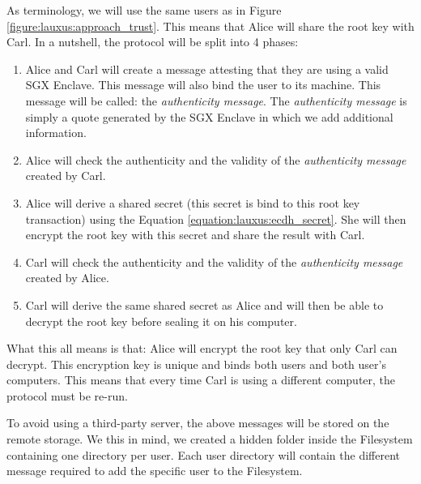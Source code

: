 \documentclass[../main.tex]{subfiles}
\begin{document}
\medbreak
\par As terminology, we will use the same users as in Figure \ref{figure:lauxus:approach_trust}. This means that Alice will share the root key with Carl. In a nutshell, the protocol will be split into 4 phases:
\begin{enumerate}
    \item Alice and Carl will create a message attesting that they are using a valid SGX Enclave. This message will also bind the user to its machine. This message will be called: the \textit{authenticity message}. The \textit{authenticity message} is simply a quote generated by the SGX Enclave in which we add additional information.
    \item Alice will check the authenticity and the validity of the \textit{authenticity message} created by Carl.
    \item Alice will derive a shared secret (this secret is bind to this root key transaction) using the Equation \ref{equation:lauxus:ecdh_secret}. She will then encrypt the root key with this secret and share the result with Carl.
    \item Carl will check the authenticity and the validity of the \textit{authenticity message} created by Alice.
    \item Carl will derive the same shared secret as Alice and will then be able to decrypt the root key before sealing it on his computer.
\end{enumerate}
\par What this all means is that: Alice will encrypt the root key that only Carl can decrypt. This encryption key is unique and binds both users and both user's computers. This means that every time Carl is using a different computer, the protocol must be re-run.
\par To avoid using a third-party server, the above messages will be stored on the remote storage. We this in mind, we created a hidden folder inside the Filesystem containing one directory per user. Each user directory will contain the different message required to add the specific user to the Filesystem.
\end{document}
